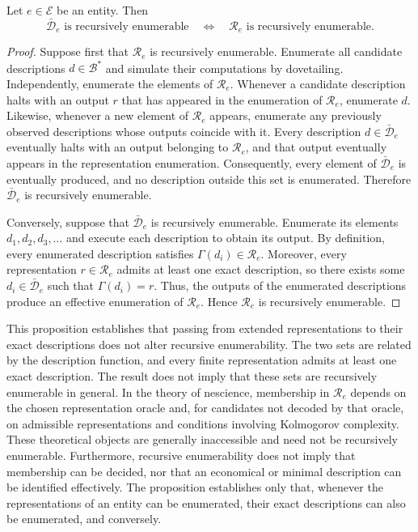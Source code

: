 \begin{proposition}
\label{prop:De_recursively_enumerable}
Let $e\in\mathcal{E}$ be an entity. Then
\[
\bar{\mathcal{D}}_e \text{ is recursively enumerable}
\quad\Longleftrightarrow\quad
\mathcal{R}_e \text{ is recursively enumerable}.
\]
\end{proposition}
\begin{proof}
Suppose first that $\mathcal{R}_e$ is recursively enumerable. Enumerate all candidate descriptions $d\in\mathcal{B}^\ast$ and simulate their computations by dovetailing. Independently, enumerate the elements of $\mathcal{R}_e$. Whenever a candidate description halts with an output $r$ that has appeared in the enumeration of $\mathcal{R}_e$, enumerate $d$. Likewise, whenever a new element of $\mathcal{R}_e$ appears, enumerate any previously observed descriptions whose outputs coincide with it. Every description $d\in\bar{\mathcal{D}}_e$ eventually halts with an output belonging to $\mathcal{R}_e$, and that output eventually appears in the representation enumeration. Consequently, every element of $\bar{\mathcal{D}}_e$ is eventually produced, and no description outside this set is enumerated. Therefore $\bar{\mathcal{D}}_e$ is recursively enumerable.

Conversely, suppose that $\bar{\mathcal{D}}_e$ is recursively enumerable. Enumerate its elements $d_1,d_2,d_3,\ldots$ and execute each description to obtain its output. By definition, every enumerated description satisfies $\Gamma(d_i)\in\mathcal{R}_e$. Moreover, every representation $r\in\mathcal{R}_e$ admits at least one exact description, so there exists some $d_i\in\bar{\mathcal{D}}_e$ such that $\Gamma(d_i)=r$. Thus, the outputs of the enumerated descriptions produce an effective enumeration of $\mathcal{R}_e$. Hence $\mathcal{R}_e$ is recursively enumerable.
\end{proof}

This proposition establishes that passing from extended representations to their exact descriptions does not alter recursive enumerability. The two sets are related by the description function, and every finite representation admits at least one exact description. The result does not imply that these sets are recursively enumerable in general. In the theory of nescience, membership in $\mathcal{R}_e$ depends on the chosen representation oracle and, for candidates not decoded by that oracle, on admissible representations and conditions involving Kolmogorov complexity. These theoretical objects are generally inaccessible and need not be recursively enumerable. Furthermore, recursive enumerability does not imply that membership can be decided, nor that an economical or minimal description can be identified effectively. The proposition establishes only that, whenever the representations of an entity can be enumerated, their exact descriptions can also be enumerated, and conversely.

